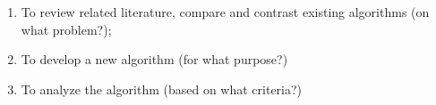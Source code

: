 \begin{comment}
How to formulate your research objectives:
1. Identify what research steps do you need to perform to achieve your general objective.
2. Identify the questions that must be answered for you to achieve your general objective.
    Thereafter, convert these questions into action statements

Example #1:

Research Question:
  What are the general features of a web-based learning environment?

Specific Objective:
   To review existing web-based learning environment that teaches language learning for children


Example #2:

Research Question:
   How will you represent commonsense knowledge for use by computer systems?

Specific Objective:
   To identify knowledge representation approaches used by existing story generation systems

Example #3:
Research Question:
   What types of storytelling knowledge are needed to generate stories?

Specific Objective:
    To identify the different types of storytelling knowledge used in generating stories

Example #4:
Research Question:
    What machine learning approaches will you utilize?

Specific Objective:
    To determine existing machine learning algorithms [that can be used in training the computer system to detect cyberbullying cases] 

Example #5: Research Question:
    How will your research output be evaluated?

Specific Objective:
    To define evaluation metrics for validating the accuracy of the translation

\end{comment}

%
%

\begin{enumerate}
   \item To review related literature, compare and contrast existing algorithms (on what problem?);
   \item To develop a new algorithm (for what purpose?)
   \item To analyze the algorithm (based on what criteria?)
\end{enumerate}


